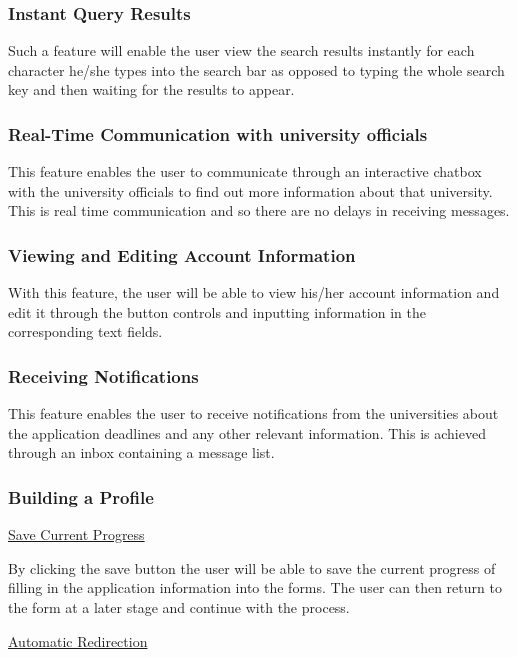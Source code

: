 \documentclass[a4paper, 12pt]{article}
\begin{document}
\subsubsection{Instant Query Results}

Such a feature will enable the user view the search results instantly for each character he/she types into the search bar as opposed to typing the whole search key and then waiting for the results to appear. 

\subsubsection{Real-Time Communication with university officials}

This feature enables the user to communicate through an interactive chatbox with the university officials to find out more information about that university. This is real time communication and so there are no delays in receiving messages.

\subsubsection{Viewing and Editing Account Information}

With this feature, the user will be able to view his/her account information and edit it through the button controls and inputting information in the corresponding text fields.

\subsubsection{Receiving Notifications}

This feature enables the user to receive notifications from the universities about the application deadlines and any other relevant information. This is achieved through an inbox containing a message list.

\subsubsection{Building a Profile}

\underline{Save Current Progress}

By clicking the save button the user will be able to save the current progress of filling in the application information into the forms. The user can then return to the form at a later stage and continue with the process.

\underline{Automatic Redirection}
\end{document}
